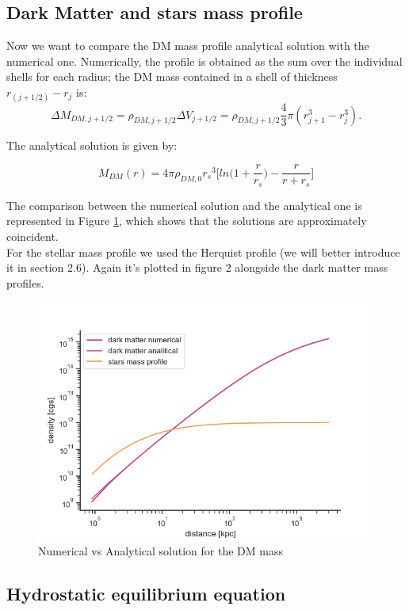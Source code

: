 \documentclass{article}
\begin{document}
\newpage
\subsection{Dark Matter and stars mass profile}

Now we want to compare the DM mass profile analytical solution with the numerical one.
Numerically, the profile is obtained as the sum over the individual shells for each radius; the DM mass contained in a shell of thickness $ r_{(j+1/2)} -r_j$ is:
\[
    \Delta {M}_{DM,j+1/2}=\rho_{DM,j+1/2}{\Delta V}_{j+1/2}=\rho_{DM,j+1/2}\frac{4}{3}\pi({r}_{j+1}^{3}-{r}_{j}^{3}).
\]

The analytical solution is given by:

\begin{equation}
    M_{DM}(r)=4\pi\rho_{DM,0}{r_s}^3\biggl[ln\bigg(1+\frac{r}{r_s}\bigg)-\frac{r}{r+r_s}\biggl]
\end{equation}

The comparison between the numerical solution and the analytical one is represented in Figure \ref{fig:figure 1}, which shows that the solutions are approximately coincident.\\
For the stellar mass profile we used the Herquist profile (we will better introduce it in section 2.6). Again it's plotted in figure 2 alongside the dark matter mass profiles.
\begin{figure}[h]
\includegraphics[width= 14 cm, trim = 0 0 0 0]{mass_profile.png}
\caption{Numerical vs Analytical solution for the DM mass}
\label{fig:figure 1}
\end{figure}

\newpage
\subsection{Hydrostatic equilibrium equation}
\end{document}
